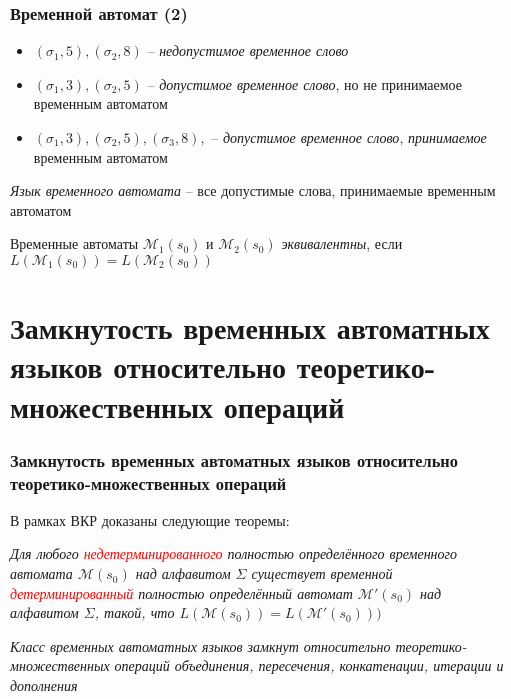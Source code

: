 \documentclass{beamer}
\begin{document}

\begin{frame}
\frametitle{Временной автомат (2)}


\begin{itemize}
    \item $(\sigma_1, 5), (\sigma_2, 8)$ -- \emph{недопустимое временное слово}
    \item $(\sigma_1, 3), (\sigma_2, 5)$ -- \emph{допустимое временное слово}, но не принимаемое временным автоматом
    \item $(\sigma_1, 3), (\sigma_2, 5), (\sigma_3, 8),$ -- \emph{допустимое временное слово}, \emph{принимаемое} временным автоматом
\end{itemize}

\textit{Язык временного автомата} -- все допустимые слова, принимаемые временным автоматом

Временные автоматы $\mathcal{M}_1(s_0)$ и $\mathcal{M}_2(s_0)$ \textit{эквивалентны}, если $L(\mathcal{M}_1(s_0)) = L(\mathcal{M}_2(s_0))$

\end{frame}

\section{Замкнутость временных автоматных языков относительно теоретико-множественных операций}

\begin{frame}
\frametitle{Замкнутость временных автоматных языков относительно теоретико-множественных операций}

В рамках ВКР доказаны следующие теоремы:
\begin{theorem}
{\itshape
Для любого \textcolor{red}{недетерминированного} полностью определённого временного автомата $\mathcal{M}(s_0)$ над алфавитом $\Sigma$ существует временной \textcolor{red}{детерминированный} полностью определённый автомат $\mathcal{M'}(s_0)$ над алфавитом $\Sigma$, такой, что $L(\mathcal{M}(s_0)) = L(\mathcal{M'}(s_0)))$
} 
\end{theorem}

\begin{theorem}
{\itshape
Класс временных автоматных языков замкнут относительно теоретико-множественных операций объединения, пересечения, конкатенации, итерации и дополнения
}
\end{theorem}

\end{frame}
\end{document}
